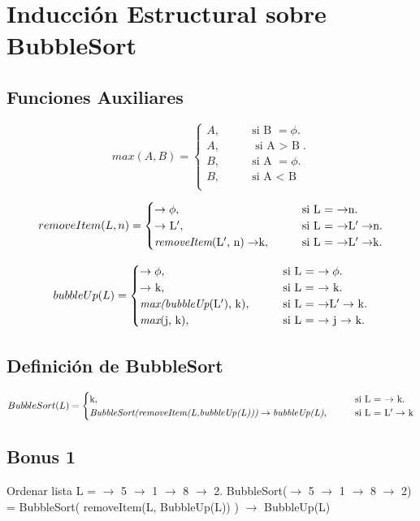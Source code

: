 \section{Inducción Estructural sobre BubbleSort}

\subsection{Funciones Auxiliares}
\[ max(A,B)=
 \begin{cases}
 A, \qquad& \text{si B $=\phi$}.\\
 A, \qquad& \text{si A $>$ B}.\\
 B, \qquad& \text{si A $=\phi$}.\\
 B, \qquad& \text{si A $<$ B}\\
\end{cases} \]

\[ removeItem(L,n)=
 \begin{cases}
 \to\phi, \qquad& \text{si L $= $ $\to$n}.\\
 \to$ L$', \qquad& \text{si L $=$ $\to$L$'\to$n}.\\
 \textit{removeItem}\text{(L$'$, n)}\to$k$,\qquad& \text{si L $=$ $\to$L$'\to$k}.
\end{cases} \]

\[ bubbleUp(L)=
 \begin{cases}
 \to\phi, \qquad& \text{si L $=$ $\to\phi$}.\\
 \to$ k$, \qquad& \text{si L $=$ $\to$ k}.\\
 \textit{max(bubbleUp}\text{(L$'$), k)}, \qquad& \text{si L $=$ $\to$L$'\to$ k}.\\
 \textit{max}\text{(j, k)}, \qquad& \text{si L $=$ $\to$ j $\to$ k}.
\end{cases} \]

\subsection{Definición de BubbleSort}
\[ BubbleSort(L)=
 \begin{cases}
 $k$, \qquad& \text{si L $=$ $\to$ k}.\\
 \textit{BubbleSort(removeItem(L,bubbleUp(L)))} \to \textit{bubbleUp(L)}, \qquad& \text{si L $=$ L$' \to$ k}\\
\end{cases} \]

\subsection{Bonus 1}
Ordenar lista L = $\to$ 5 $\to$ 1 $\to$ 8 $\to$ 2.
\newline
\newline
BubbleSort($\to$ 5 $\to$ 1 $\to$ 8 $\to$ 2) = BubbleSort( removeItem(L, BubbleUp(L)) ) $\to$ BubbleUp(L)
